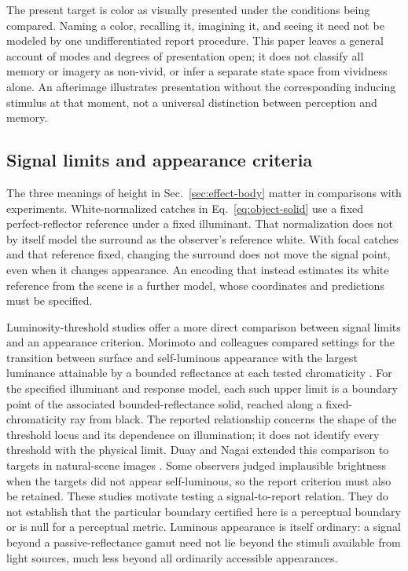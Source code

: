 \documentclass[11pt,letterpaper]{article}
\theoremstyle{plain}
\begin{document}
The present target is color as visually presented under the conditions being compared. Naming a color, recalling it, imagining it, and seeing it need not be modeled by one undifferentiated report procedure. This paper leaves a general account of modes and degrees of presentation open; it does not classify all memory or imagery as non-vivid, or infer a separate state space from vividness alone. An afterimage illustrates presentation without the corresponding inducing stimulus at that moment, not a universal distinction between perception and memory.

\subsection{Signal limits and appearance criteria}
\label{sec:luminosity-comparison}
The three meanings of height in Sec.~\ref{sec:effect-body} matter in comparisons with experiments. White-normalized catches in Eq.~\eqref{eq:object-solid} use a fixed perfect-reflector reference under a fixed illuminant. That normalization does not by itself model the surround as the observer's reference white. With focal catches and that reference fixed, changing the surround does not move the signal point, even when it changes appearance. An encoding that instead estimates its white reference from the scene is a further model, whose coordinates and predictions must be specified.

Luminosity-threshold studies offer a more direct comparison between signal limits and an appearance criterion. Morimoto and colleagues compared settings for the transition between surface and self-luminous appearance with the largest luminance attainable by a bounded reflectance at each tested chromaticity \cite{Morimoto2021}. For the specified illuminant and response model, each such upper limit is a boundary point of the associated bounded-reflectance solid, reached along a fixed-chromaticity ray from black. The reported relationship concerns the shape of the threshold locus and its dependence on illumination; it does not identify every threshold with the physical limit. Duay and Nagai extended this comparison to targets in natural-scene images \cite{Duay2026}. Some observers judged implausible brightness when the targets did not appear self-luminous, so the report criterion must also be retained. These studies motivate testing a signal-to-report relation. They do not establish that the particular boundary certified here is a perceptual boundary or is null for a perceptual metric. Luminous appearance is itself ordinary: a signal beyond a passive-reflectance gamut need not lie beyond the stimuli available from light sources, much less beyond all ordinarily accessible appearances.
\end{document}
